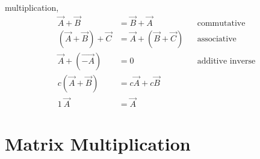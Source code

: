 \begin{description}
        multiplication,
        \begin{align}
            \vec{A} + \vec{B}             & = \vec{B} + \vec{A}             &
                                          & \text{commutative}                    \\
            (\vec{A} + \vec{B}) + \vec{C} & = \vec{A} + (\vec{B} + \vec{C}) &
                                          & \text{associative}                    \\
            \vec{A} + (\vec{-A})          & = 0                             &
                                          & \text{additive inverse}               \\
            c(\vec{A} + \vec{B})          & = c\vec{A} + c\vec{B}           &   & \\
            1\ \vec{A}                    & = \vec{A}
        \end{align}
\end{description}

\section{Matrix Multiplication}

